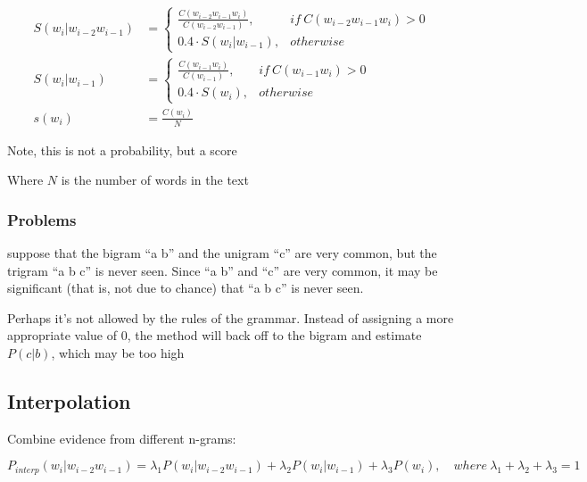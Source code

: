 \documentclass[11pt]{article}
\begin{document}
\begin{definition}
    \begin{align*}
        S(w_i|w_{i-2}w_{i-1}) &=
        \begin{cases}
            \frac{C(w_{i-2}w_{i-1}w_i)}{C(w_{i-2}w_{i-1})} , & if\ C(w_{i-2}w_{i-1}w_i) > 0 \\
            0.4 \cdot S(w_i|w_{i-1}) , & otherwise    
        \end{cases} \\
        S(w_i|w_{i-1}) &=
        \begin{cases}
            \frac{C(w_{i-1}w_i)}{C(w_{i-1})} , & if\ C(w_{i-1}w_i) > 0 \\
            0.4 \cdot S(w_i) , & otherwise    
        \end{cases} \\
        s(w_i) &= \frac{C(w_i)} N
    \end{align*}    

    \begin{warning}
        Note, this is not a probability, but a score
    \end{warning}
\end{definition}

Where $N$ is the number of words in the text

\subsubsection{Problems}

suppose that the bigram ``a b'' and the unigram ``c'' are very common, but the trigram ``a b c'' is never seen. Since ``a b'' and ``c'' are very common, it may be significant (that is, not due to chance) that ``a b c'' is never seen.

Perhaps it's not allowed by the rules of the grammar.  Instead of assigning a more appropriate value of 0, the method will back off to the bigram and estimate $P(c | b)$, which may be too high

\subsection{Interpolation}

Combine evidence from different n-grams:

\begin{definition}[Interpolation]
    \begin{equation*}
        P_{interp}(w_i|w_{i-2}w_{i-1})=\lambda_1 P(w_i|w_{i-2} w_{i-1}) + \lambda_2 P(w_i|w_{i-1}) + \lambda_3 P(w_i), \quad where\ \lambda_1 + \lambda_2 + \lambda_3 = 1
    \end{equation*}
\end{definition}
\end{document}
